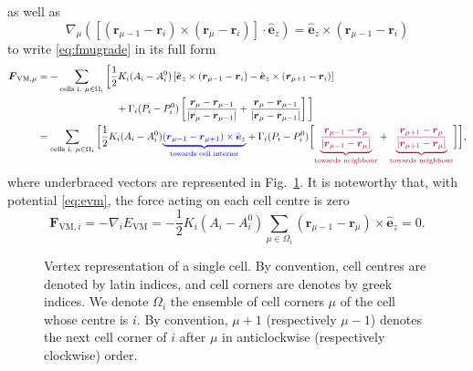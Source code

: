 \documentclass[aps, superscriptaddress, notitlepage, longbibliography]{revtex4-1}
\begin{document}
as well as
\begin{equation}
\nabla_{\mu} \left([(\boldsymbol{r}_{\mu - 1} - \boldsymbol{r}_i) \times (\boldsymbol{r}_{\mu} - \boldsymbol{r}_i)] \cdot \hat{\boldsymbol{e}}_z\right) = \hat{\boldsymbol{e}}_z \times (\boldsymbol{r}_{\mu - 1} - \boldsymbol{r}_i)
\end{equation}
to write \eqref{eq:fmugrade} in its full form
\begin{equation}
\begin{aligned}
\boldsymbol{F}_{\mathrm{VM},\mu} &= - \sum_{\text{cells i},~ \mu \in \Omega_i} \bigg[\frac{1}{2} K_i (A_i - A^0_i) \left[\hat{\boldsymbol{e}}_z \times (\boldsymbol{r}_{\mu - 1} - \boldsymbol{r}_i) - \hat{\boldsymbol{e}}_z \times (\boldsymbol{r}_{\mu + 1} - \boldsymbol{r}_i)\right]\\
&\qquad\qquad\qquad\qquad+ \Gamma_i (P_i - P^0_i) \left[\frac{\boldsymbol{r}_{\mu} - \boldsymbol{r}_{\mu - 1}}{|\boldsymbol{r}_{\mu} - \boldsymbol{r}_{\mu - 1}|} + \frac{\boldsymbol{r}_{\mu} - \boldsymbol{r}_{\mu - 1}}{|\boldsymbol{r}_{\mu} - \boldsymbol{r}_{\mu - 1}|}\right]\bigg]\\
&= \sum_{\text{cells i},~ \mu \in \Omega_i} \bigg[\frac{1}{2} K_i (A_i - A^0_i) {\color{blue} \underbrace{(\boldsymbol{r}_{\mu - 1} - \boldsymbol{r}_{\mu + 1}) \times \hat{\boldsymbol{e}}_z}_{\text{towards cell interior}}} + \Gamma_i (P_i - P^0_i) \bigg[{\color{purple} \underbrace{\frac{\boldsymbol{r}_{\mu - 1} - \boldsymbol{r}_{\mu}}{|\boldsymbol{r}_{\mu - 1} - \boldsymbol{r}_{\mu}|}}_{\text{towards neighbour}}} + {\color{purple} \underbrace{\frac{\boldsymbol{r}_{\mu + 1} - \boldsymbol{r}_{\mu}}{|\boldsymbol{r}_{\mu + 1} - \boldsymbol{r}_{\mu}|}}_{\text{towards neighbour}}}\bigg]\bigg],
\end{aligned}
\end{equation}
where underbraced vectors are represented in Fig.~\ref{fig:fmu}. It is noteworthy that, with potential \eqref{eq:evm}, the force acting on each cell centre is zero
\begin{equation}
\boldsymbol{F}_{\mathrm{VM}, i} = - \nabla_i E_{\mathrm{VM}} = - \frac{1}{2} K_i (A_i - A^0_i) \sum_{\mu \in \Omega_i} (\boldsymbol{r}_{\mu - 1} - \boldsymbol{r}_{\mu}) \times \hat{\boldsymbol{e}}_z = 0.
\end{equation}

\begin{figure}[!t]
\centering
\begin{tikzpicture}[scale=\scale]

\end{tikzpicture}
\caption{Vertex representation of a single cell. By convention, cell centres are denoted by latin indices, and cell corners are denotes by greek indices. We denote $\Omega_i$ the ensemble of cell corners $\mu$ of the cell whose centre is $i$. By convention, $\mu + 1$ (respectively $\mu - 1$) denotes the next cell corner of $i$ after $\mu$ in anticlockwise (respectively clockwise) order.}
\label{fig:fmu}
\end{figure}
\end{document}
